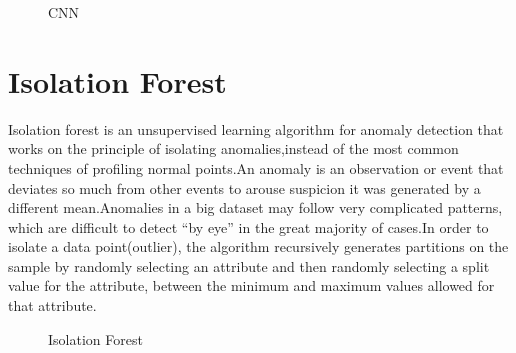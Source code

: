 \begin{figure}
%
  \caption{CNN}
  \label{fig:key}
\end{figure}


\section{Isolation Forest}
Isolation forest is an unsupervised learning algorithm for anomaly detection that works on the principle of isolating anomalies,instead of the most common techniques of profiling normal points.An anomaly is an observation or event that deviates so much from other events to arouse suspicion it was generated by a different mean.Anomalies in a big dataset may follow very complicated patterns, which are difficult to detect “by eye” in the great majority of cases.In order to isolate a data point(outlier), the algorithm recursively generates partitions on the sample by randomly selecting an attribute and then randomly selecting a split value for the attribute, between the minimum and maximum values allowed for that attribute.\cite{isolationF}
\begin{figure}
%
  \caption{Isolation Forest}
  \label{fig:key}
\end{figure}





 